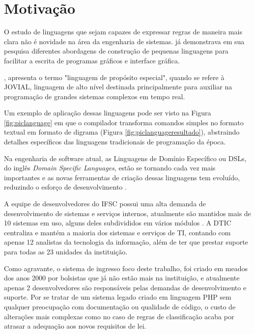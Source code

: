 \section{Motivação}
\label{motivacao}

O estudo de linguagens que sejam capazes de expressar regras de maneira mais clara não é novidade na área da engenharia de sistemas.  já demonstrava em sua pesquisa diferentes abordagens de construção de pequenas linguagens para facilitar a escrita de programas gráficos e interface gráfica.


, apresenta o termo "linguagem de propósito especial", quando se refere à \gls{JOVIAL}, linguagem de alto nível destinada principalmente para auxiliar na programação de grandes sistemas complexos em tempo real. 

Um exemplo de aplicação dessas linguagens pode ser visto na Figura \ref{fig:piclanguage} em que o compilador transforma comandos simples no formato textual em formato de digrama (Figura \ref{fig:piclanguageresultado}), abstraindo detalhes específicos das linguagens tradicionais de programação da época.





Na engenharia de software atual, as Linguagens de Domínio Específico ou DSLs, do inglês \textit{Domain Specific Languages}, estão se tornando cada vez mais importantes e as novas ferramentas de criação dessas linguagens tem evoluído, reduzindo o esforço de desenvolvimento \cite{dslengineering}.


A equipe de desenvolvedores do \gls{IFSC} possui uma alta demanda de desenvolvimento de sistemas e serviços internos, atualmente são mantidos mais de 10 sistemas em uso, alguns deles subdivididos em vários módulos \cite{catalogoifsc}. A \gls{DTIC} centraliza e mantém a maioria dos sistemas e serviços de TI, contando com apenas 12 analistas da tecnologia da informação, além de ter que prestar suporte para todas as 23 unidades da instituição. 

Como agravante, o sistema de ingresso foco deste trabalho, foi criado em meados dos anos 2000 por bolsistas que já não estão mais na instituição, e atualmente apenas 2 desenvolvedores são responsáveis pelas demandas de desenvolvimento e suporte. Por se tratar de um sistema legado criado em linguagem PHP sem qualquer preocupação com documentação ou qualidade de código, o custo de alterações mais complexas como no caso de regras de classificação acaba por atrasar a adequação aos novos requisitos de lei. 

